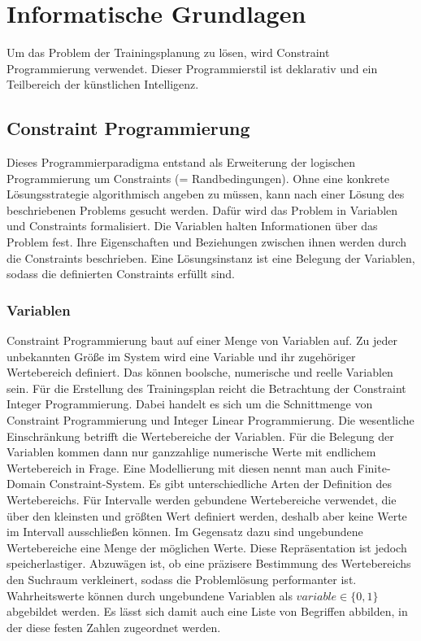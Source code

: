 \chapter{Informatische Grundlagen}
\label{sec:grundlagen:info}
Um das Problem der Trainingsplanung zu lösen, wird Constraint Programmierung verwendet. Dieser Programmierstil ist deklarativ und ein Teilbereich der künstlichen Intelligenz.

\section{Constraint Programmierung}
Dieses Programmierparadigma entstand als Erweiterung der logischen Programmierung um Constraints (= Randbedingungen). Ohne eine konkrete Lösungsstrategie algorithmisch angeben zu müssen, kann nach einer Lösung des beschriebenen Problems gesucht werden. Dafür wird das Problem in Variablen und Constraints formalisiert. Die Variablen halten Informationen über das Problem fest. Ihre Eigenschaften und Beziehungen zwischen ihnen werden durch die Constraints beschrieben. Eine Lösungsinstanz ist eine Belegung der Variablen, sodass die definierten Constraints erfüllt sind. \cite{EssentialsConstraintProgrammierung, HandbookConstraintProgramming}

\subsection{Variablen}
Constraint Programmierung baut auf einer Menge von Variablen auf. Zu jeder unbekannten Größe im System wird eine Variable und ihr zugehöriger Wertebereich definiert. Das können boolsche, numerische und reelle Variablen sein.
Für die Erstellung des Trainingsplan reicht die Betrachtung der Constraint Integer Programmierung. Dabei handelt es sich um die Schnittmenge von Constraint Programmierung und Integer Linear Programmierung. Die wesentliche Einschränkung betrifft die Wertebereiche der Variablen. Für die Belegung der Variablen kommen dann nur ganzzahlige numerische Werte mit endlichem Wertebereich in Frage. Eine Modellierung mit diesen nennt man auch Finite-Domain Constraint-System. Es gibt unterschiedliche Arten der Definition des Wertebereichs. Für Intervalle werden gebundene Wertebereiche verwendet, die über den kleinsten und größten Wert definiert werden, deshalb aber keine Werte im Intervall ausschließen können. Im Gegensatz dazu sind ungebundene Wertebereiche eine Menge der möglichen Werte. Diese Repräsentation ist jedoch speicherlastiger. Abzuwägen ist, ob eine präzisere Bestimmung des Wertebereichs den Suchraum verkleinert, sodass die Problemlösung performanter ist. \newline
Wahrheitswerte können durch ungebundene Variablen als $variable \in \{0, 1\}$ abgebildet werden. Es lässt sich damit auch eine Liste von Begriffen abbilden, in der diese festen Zahlen zugeordnet werden. \cite{HandbookKnowledgeRepresentation}

